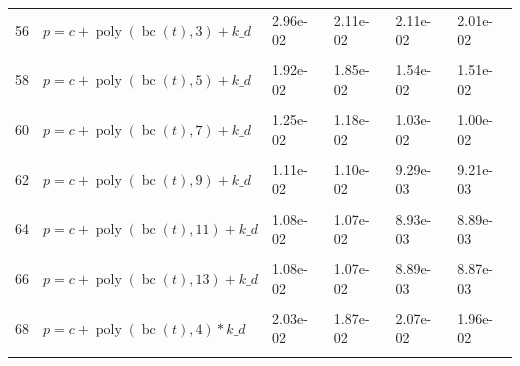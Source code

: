 \documentclass[12pt,a4paper]{article}
\DeclareMathOperator{\bc}{bc}
\DeclareMathOperator{\poly}{poly}
\begin{document}
\begin{longtable}[t]{ll>{\raggedleft\arraybackslash}p{2cm}>{\raggedleft\arraybackslash}p{2cm}>{\raggedleft\arraybackslash}p{2cm}>{\raggedleft\arraybackslash}p{2cm}}
56 & $p = c + \poly\left( \bc(t), 3 \right) + k\_d$ & 2.96e-02 & 2.11e-02 & 2.11e-02 & 2.01e-02\\
\cellcolor{gray!6}{57} & \cellcolor{gray!6}{$p = c + \poly\left( \bc(t), 4 \right) + k\_d$} & \cellcolor{gray!6}{2.39e-02} & \cellcolor{gray!6}{2.22e-02} & \cellcolor{gray!6}{2.34e-02} & \cellcolor{gray!6}{2.24e-02}\\
58 & $p = c + \poly\left( \bc(t), 5 \right) + k\_d$ & 1.92e-02 & 1.85e-02 & 1.54e-02 & 1.51e-02\\
\cellcolor{gray!6}{59} & \cellcolor{gray!6}{$p = c + \poly\left( \bc(t), 6 \right) + k\_d$} & \cellcolor{gray!6}{1.30e-02} & \cellcolor{gray!6}{1.24e-02} & \cellcolor{gray!6}{1.16e-02} & \cellcolor{gray!6}{1.09e-02}\\
60 & $p = c + \poly\left( \bc(t), 7 \right) + k\_d$ & 1.25e-02 & 1.18e-02 & 1.03e-02 & 1.00e-02\\
\cellcolor{gray!6}{61} & \cellcolor{gray!6}{$p = c + \poly\left( \bc(t), 8 \right) + k\_d$} & \cellcolor{gray!6}{1.13e-02} & \cellcolor{gray!6}{1.11e-02} & \cellcolor{gray!6}{9.21e-03} & \cellcolor{gray!6}{9.18e-03}\\
62 & $p = c + \poly\left( \bc(t), 9 \right) + k\_d$ & 1.11e-02 & 1.10e-02 & 9.29e-03 & 9.21e-03\\
\cellcolor{gray!6}{63} & \cellcolor{gray!6}{$p = c + \poly\left( \bc(t), 10 \right) + k\_d$} & \cellcolor{gray!6}{1.08e-02} & \cellcolor{gray!6}{1.07e-02} & \cellcolor{gray!6}{8.93e-03} & \cellcolor{gray!6}{8.90e-03}\\
64 & $p = c + \poly\left( \bc(t), 11 \right) + k\_d$ & 1.08e-02 & 1.07e-02 & 8.93e-03 & 8.89e-03\\
\cellcolor{gray!6}{65} & \cellcolor{gray!6}{$p = c + \poly\left( \bc(t), 12 \right) + k\_d$} & \cellcolor{gray!6}{1.08e-02} & \cellcolor{gray!6}{1.07e-02} & \cellcolor{gray!6}{8.91e-03} & \cellcolor{gray!6}{8.88e-03}\\
66 & $p = c + \poly\left( \bc(t), 13 \right) + k\_d$ & 1.08e-02 & 1.07e-02 & 8.89e-03 & 8.87e-03\\
\cellcolor{gray!6}{67} & \cellcolor{gray!6}{$p = c + \poly\left( \bc(t), 3 \right) * k\_d$} & \cellcolor{gray!6}{2.73e-02} & \cellcolor{gray!6}{1.79e-02} & \cellcolor{gray!6}{1.87e-02} & \cellcolor{gray!6}{1.76e-02}\\
68 & $p = c + \poly\left( \bc(t), 4 \right) * k\_d$ & 2.03e-02 & 1.87e-02 & 2.07e-02 & 1.96e-02\\
\cellcolor{gray!6}{69} & \cellcolor{gray!6}{$p = c + \poly\left( \bc(t), 5 \right) * k\_d$} & \cellcolor{gray!6}{1.51e-02} & \cellcolor{gray!6}{1.47e-02} & \cellcolor{gray!6}{1.22e-02} & \cellcolor{gray!6}{1.20e-02}\\

\end{longtable}
\end{document}
